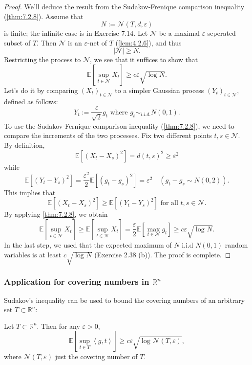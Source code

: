 \begin{proof}
We'll deduce the result from the Sudakov-Frenique comparison inequality (\cref{thm:7.2.8}). Assume that 
\[ N := \mathcal{N}(T, d, \varepsilon) \]
is finite; the infinite case is in Exercise 7.14. Let $\mathcal{N}$ be a maximal $\varepsilon$-seperated subset 
of $T$. Then $\mathcal{N}$ is an $\varepsilon$-net of $T$ (\cref{lem:4.2.6}), and thus 
\[ |\mathcal{N}| \geq N. \]
Restricting the process to $\mathcal{N}$, we see that it suffices to show that 
\[ \mathbb{E}\left[ \sup_{t \in \mathcal{N}} X_t \right] \geq c \varepsilon \sqrt{\log_{}{N}}. \]
Let's do it by comparing $(X_t)_{t \in \mathcal{N}}$ to a simpler Gaussian process $(Y_t)_{t \in \mathcal{N}}$, 
defined as follows: 
\[ Y_t := \frac{\varepsilon}{\sqrt{2}}g_t \text{ where } g_t \sim_{i.i.d.} N(0, 1). \]
To use the Sudakov-Fernique comparison inequality (\cref{thm:7.2.8}), we need to compare the increments of 
the two processes. Fix two different points $t, s \in \mathcal{N}$. By definition, 
\[ \mathbb{E}\left[ (X_t - X_s)^2 \right] = d(t, s)^2 \geq \varepsilon^2 \]
while 
\[ \mathbb{E}\left[ (Y_t - Y_s)^2 \right] = \frac{\varepsilon^2}{2}\mathbb{E}\left[ (g_t - g_s)^2 \right] = 
\varepsilon^2 \quad (g_t - g_s \sim N(0, 2)). \]
This implies that 
\[ \mathbb{E}\left[ (X_t - X_s)^2 \right] \geq \mathbb{E}\left[ (Y_t - Y_s)^2 \right] \text{ for all } 
t, s \in \mathcal{N}. \]
By applying \cref{thm:7.2.8}, we obtain 
\[ \mathbb{E}\left[ \sup_{t \in \mathcal{N}}X_t \right] \geq \mathbb{E}\left[ \sup_{t \in \mathcal{N}}X_t 
\right] = \frac{\varepsilon}{2}\mathbb{E}\left[ \max_{t \in \mathcal{N}}g_t \right] 
\geq c \varepsilon \sqrt{\log_{}{N}}. \]
In the last step, we used that the expected maximum of $N$ i.i.d $N(0, 1)$ random variables is at least 
$c \sqrt{\log_{}{N}}$ (Exercise 2.38 (b)). The proof is complete.
\end{proof}


\subsubsection{Application for covering numbers in \texorpdfstring{$\mathbb{R}^n$}{}}
Sudakov's inequality can be used to bound the covering numbers of an arbitrary set $T \subset \mathbb{R}^n$: 

\begin{corollary}
\label{cor:7.4.2}
Let $T \subset \mathbb{R}^n$. Then for any $\varepsilon > 0$, 
\[ \mathbb{E}\left[ \sup_{t \in T} \left\langle g, t \right\rangle \right] 
\geq c \varepsilon \sqrt{\log_{}{\mathcal{N}(T, \varepsilon)}}, \]
where $\mathcal{N}(T, \varepsilon)$ just the covering number of $T$.
\end{corollary}

